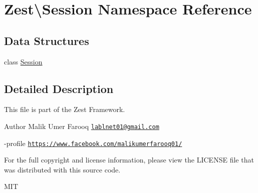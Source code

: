 \hypertarget{namespace_zest_1_1_session}{}\section{Zest\textbackslash{}Session Namespace Reference}
\label{namespace_zest_1_1_session}
\subsection*{Data Structures}
\begin{DoxyCompactItemize}
\item 
class \mbox{\hyperlink{class_zest_1_1_session_1_1_session}{Session}}
\end{DoxyCompactItemize}


\subsection{Detailed Description}
This file is part of the Zest Framework.

\begin{DoxyAuthor}{Author}
Malik Umer Farooq \href{mailto:lablnet01@gmail.com}{\tt lablnet01@gmail.\+com} 

-\/profile \href{https://www.facebook.com/malikumerfarooq01/}{\tt https\+://www.\+facebook.\+com/malikumerfarooq01/}
\end{DoxyAuthor}
For the full copyright and license information, please view the L\+I\+C\+E\+N\+SE file that was distributed with this source code.

M\+IT 